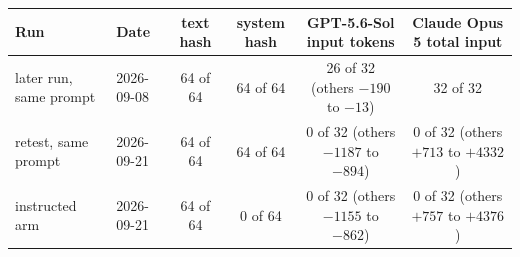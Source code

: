\begingroup\scriptsize\setlength{\tabcolsep}{4pt}
\begin{tabular}{@{}llcccc@{}}
\toprule
Run & Date & text hash & system hash & GPT-5.6-Sol input tokens & Claude Opus 5 total input \\
\midrule
later run, same prompt & 2026-09-08 & 64 of 64 & 64 of 64 & 26 of 32 (others $-190$ to $-13$) & 32 of 32 \\
retest, same prompt & 2026-09-21 & 64 of 64 & 64 of 64 & 0 of 32 (others $-1187$ to $-894$) & 0 of 32 (others $+713$ to $+4332$) \\
instructed arm & 2026-09-21 & 64 of 64 & 0 of 64 & 0 of 32 (others $-1155$ to $-862$) & 0 of 32 (others $+757$ to $+4376$) \\
\bottomrule
\end{tabular}
\endgroup
